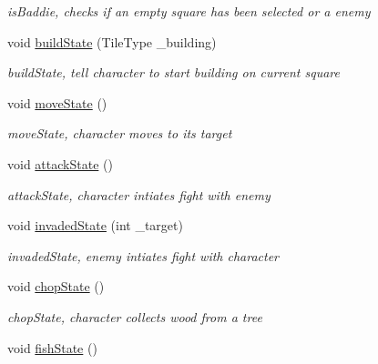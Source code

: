 \begin{DoxyCompactItemize}
\begin{DoxyCompactList}\small\item\em is\+Baddie, checks if an empty square has been selected or a enemy \end{DoxyCompactList}\item 
void \hyperlink{class_character_a027a0a9a03ca8cc36e1045ed8a6c114f}{build\+State} (Tile\+Type \+\_\+building)
\begin{DoxyCompactList}\small\item\em build\+State, tell character to start building on current square \end{DoxyCompactList}\item 
\hypertarget{class_character_a2e5fa6b946fd27bdd77ada22a6a0597b}{}void \hyperlink{class_character_a2e5fa6b946fd27bdd77ada22a6a0597b}{move\+State} ()\label{class_character_a2e5fa6b946fd27bdd77ada22a6a0597b}

\begin{DoxyCompactList}\small\item\em move\+State, character moves to its target \end{DoxyCompactList}\item 
\hypertarget{class_character_ae0211434c80eaba82a127053f9c865c1}{}void \hyperlink{class_character_ae0211434c80eaba82a127053f9c865c1}{attack\+State} ()\label{class_character_ae0211434c80eaba82a127053f9c865c1}

\begin{DoxyCompactList}\small\item\em attack\+State, character intiates fight with enemy \end{DoxyCompactList}\item 
\hypertarget{class_character_ac6f70dc7b67bc8c6bc445e1727227c7e}{}void \hyperlink{class_character_ac6f70dc7b67bc8c6bc445e1727227c7e}{invaded\+State} (int \+\_\+target)\label{class_character_ac6f70dc7b67bc8c6bc445e1727227c7e}

\begin{DoxyCompactList}\small\item\em invaded\+State, enemy intiates fight with character \end{DoxyCompactList}\item 
\hypertarget{class_character_a9d14e312b1eb86cd64b0436c55213b7b}{}void \hyperlink{class_character_a9d14e312b1eb86cd64b0436c55213b7b}{chop\+State} ()\label{class_character_a9d14e312b1eb86cd64b0436c55213b7b}

\begin{DoxyCompactList}\small\item\em chop\+State, character collects wood from a tree \end{DoxyCompactList}\item 
\hypertarget{class_character_a7b22a293d22630d2ad08a1a71a3c58cd}{}void \hyperlink{class_character_a7b22a293d22630d2ad08a1a71a3c58cd}{fish\+State} ()\label{class_character_a7b22a293d22630d2ad08a1a71a3c58cd}


\end{DoxyCompactItemize}
